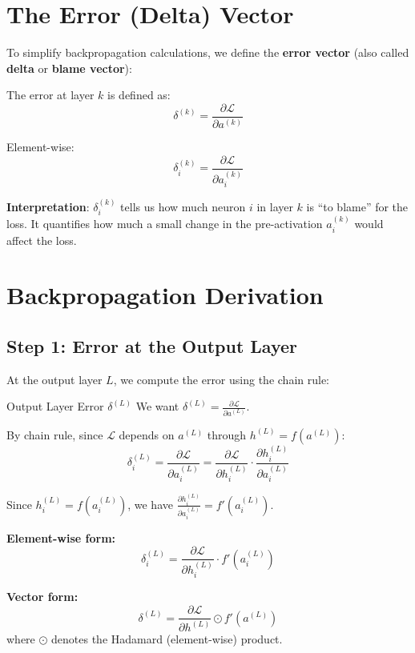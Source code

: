 \section{The Error (Delta) Vector}

To simplify backpropagation calculations, we define the \textbf{error vector} (also called \textbf{delta} or \textbf{blame vector}):

\begin{definition}
The error at layer $k$ is defined as:
\[
\boxed{\delta^{(k)} = \frac{\partial \mathcal{L}}{\partial a^{(k)}}}
\]

Element-wise:
\[
\delta_i^{(k)} = \frac{\partial \mathcal{L}}{\partial a_i^{(k)}}
\]
\end{definition}

\textbf{Interpretation}: $\delta_i^{(k)}$ tells us how much neuron $i$ in layer $k$ is ``to blame'' for the loss. It quantifies how much a small change in the pre-activation $a_i^{(k)}$ would affect the loss.

\section{Backpropagation Derivation}

\subsection{Step 1: Error at the Output Layer}

At the output layer $L$, we compute the error using the chain rule:

\begin{derivation}{Output Layer Error $\delta^{(L)}$}
We want $\delta^{(L)} = \frac{\partial \mathcal{L}}{\partial a^{(L)}}$.

By chain rule, since $\mathcal{L}$ depends on $a^{(L)}$ through $h^{(L)} = f(a^{(L)})$:
\[
\delta_i^{(L)} = \frac{\partial \mathcal{L}}{\partial a_i^{(L)}} = \frac{\partial \mathcal{L}}{\partial h_i^{(L)}} \cdot \frac{\partial h_i^{(L)}}{\partial a_i^{(L)}}
\]

Since $h_i^{(L)} = f(a_i^{(L)})$, we have $\frac{\partial h_i^{(L)}}{\partial a_i^{(L)}} = f'(a_i^{(L)})$.

\textbf{Element-wise form:}
\[
\boxed{\delta_i^{(L)} = \frac{\partial \mathcal{L}}{\partial h_i^{(L)}} \cdot f'(a_i^{(L)})}
\]

\textbf{Vector form:}
\[
\boxed{\delta^{(L)} = \frac{\partial \mathcal{L}}{\partial h^{(L)}} \odot f'(a^{(L)})}
\]
where $\odot$ denotes the Hadamard (element-wise) product.
\end{derivation}

